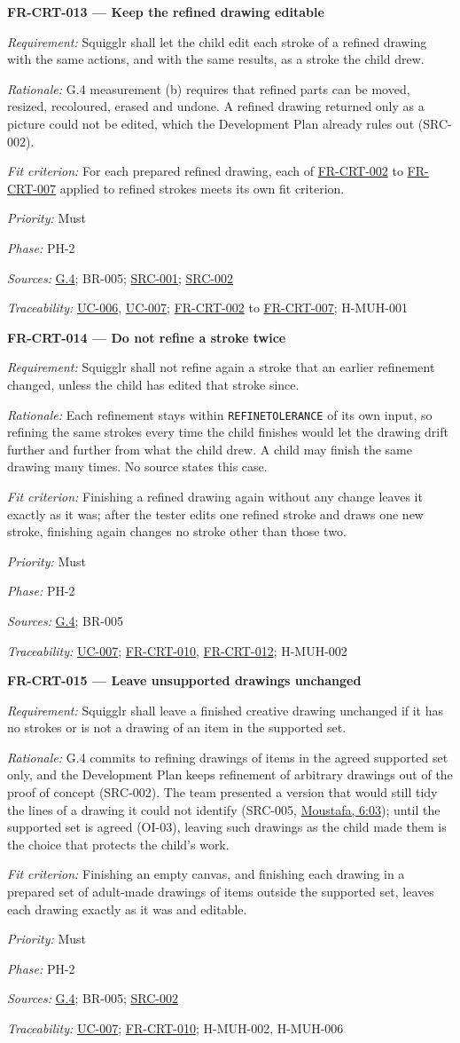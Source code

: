 \documentclass[12pt]{article}
\renewcommand{\_}{\textunderscore\allowbreak}%
\newcommand{\intlink}[3]{\hyperref[int:#1-#2]{#3}}
\newcommand{\intref}[2]{\intlink{#1}{#2}{#1, #2}}
\newcommand{\goalref}[1]{\hyperref[goal:#1]{G.#1}}
\newcommand{\ucref}[1]{\hyperref[uc:#1]{\mbox{UC-#1}}}
\newenvironment{srsrequirement}[2]{%
  \par\medskip\noindent\phantomsection\label{req:#1}%
  \textbf{#1 --- #2}\par\nobreak\smallskip }{\par\medskip}
\newcommand{\reqfield}[2]{\noindent\textit{#1:} #2\par}
\newcommand{\reqshall}[1]{\reqfield{Requirement}{#1}}
\newcommand{\reqrationale}[1]{\reqfield{Rationale}{#1}}
\newcommand{\reqfit}[1]{\reqfield{Fit criterion}{#1}}
\newcommand{\reqpriority}[1]{\reqfield{Priority}{#1}}
\newcommand{\reqphase}[1]{\reqfield{Phase}{#1}}
\newcommand{\reqsources}[1]{\reqfield{Sources}{#1}}
\newcommand{\reqtraces}[1]{\reqfield{Traceability}{#1}}
\newcommand{\reqref}[1]{\hyperref[req:#1]{#1}}
\newcommand{\srcref}[1]{\hyperref[src:#1]{SRC-#1}}
\providecommand{\ucref}[1]{\hyperref[uc:#1]{UC-#1}}
\begin{document}
\begin{srsrequirement}{FR-CRT-013}{Keep the refined drawing editable}
  \reqshall{Squigglr shall let the child edit each stroke of a refined drawing
with the same actions, and with the same results, as a stroke the child drew.}
\reqrationale{G.4 measurement (b) requires that refined parts can be moved,
resized, recoloured, erased and undone. A refined drawing returned only as a
picture could not be edited, which the Development Plan already rules out
(SRC-002).} \reqfit{For each prepared refined drawing, each of
\reqref{FR-CRT-002} to \reqref{FR-CRT-007} applied to refined strokes meets its
own fit criterion.}
  \reqpriority{Must}
  \reqphase{PH-2}
  \reqsources{\goalref{4}; BR-005; \srcref{001}; \srcref{002}}
  \reqtraces{\ucref{006}, \ucref{007}; \reqref{FR-CRT-002} to
  \reqref{FR-CRT-007}; H-MUH-001}
\end{srsrequirement}

\begin{srsrequirement}{FR-CRT-014}{Do not refine a stroke twice}
  \reqshall{Squigglr shall not refine again a stroke that an earlier refinement
changed, unless the child has edited that stroke since.}
  \reqrationale{Each refinement stays within \texttt{REFINE\_\allowbreak TOLERANCE}
of its own input, so refining the same strokes every time the child finishes
would let the drawing drift further and further from what the child drew. A
child may finish the same drawing many times. No source states this case.}
\reqfit{Finishing a refined drawing again without any change leaves it exactly
as it was; after the tester edits one refined stroke and draws one new stroke,
finishing again changes no stroke other than those two.}
  \reqpriority{Must}
  \reqphase{PH-2}
  \reqsources{\goalref{4}; BR-005} \reqtraces{\ucref{007}; \reqref{FR-CRT-010},
  \reqref{FR-CRT-012}; H-MUH-002}
\end{srsrequirement}

\begin{srsrequirement}{FR-CRT-015}{Leave unsupported drawings unchanged}
  \reqshall{Squigglr shall leave a finished creative drawing unchanged if it has
no strokes or is not a drawing of an item in the supported set.}
\reqrationale{G.4 commits to refining drawings of items in the agreed supported
set only, and the Development Plan keeps refinement of arbitrary drawings out of
the proof of concept (SRC-002). The team presented a version that would still
tidy the lines of a drawing it could not identify (SRC-005,
\intref{Moustafa}{6:03}); until the supported set is agreed (OI-03), leaving
such drawings as the child made them is the choice that protects the child's
work.} \reqfit{Finishing an empty canvas, and finishing each drawing in a
prepared set of adult-made drawings of items outside the supported set, leaves
each drawing exactly as it was and editable.}
  \reqpriority{Must}
  \reqphase{PH-2}
  \reqsources{\goalref{4}; BR-005; \srcref{002}} \reqtraces{\ucref{007};
  \reqref{FR-CRT-010}; H-MUH-002, H-MUH-006}
\end{srsrequirement}
\end{document}
